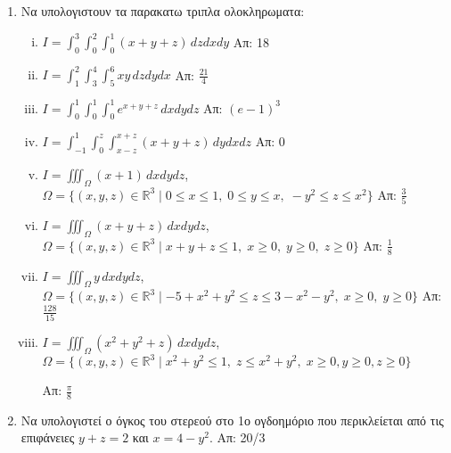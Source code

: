 


\pagestyle{askhseis}
\everymath{\displaystyle}



\begin{center}
  \minibox{\large\bf \textcolor{Col1}{Ασκήσεις Τριπλο Ολοκλήρωμα}}
\end{center}

\vspace{\baselineskip}

\begin{enumerate}
  \item Να υπολογιστουν τα παρακατω τριπλα ολοκληρωματα:
    \begin{enumerate}[i)]
      \item $ I=\int_{0}^{3}\!\!\int_{0}^{2}\!\!\int_{0}^{1}(x+y+z)\,dzdxdy $ 
        \hfill Απ: 18  
      \item $  I=\int_{1}^{2}\!\!\int_{3}^{4}\!\!\int_{5}^{6}xy\,dzdydx  $ 
        \hfill Απ: $ \frac{21}{4} $ 
      \item $ I=\int_{0}^{1}\!\!\int_{0}^{1}\!\!\int_{0}^{1}e^{x+y+z}\,dxdydz $ 
        \hfill Απ: $ (e-1)^{3} $
      \item $ I=\int_{-1}^{1}\!\!\int_{0}^{z}\!\int_{x-z}^{x+z}(x+y+z)\,dydxdz $ 
        \hfill Απ: 0  
      \item $ I=\iiint_{\Omega}(x+1)\,dxdydz $, \quad $ \Omega = \{(x,y,z)\in 
          \mathbb{R}^{3} \mid 0 \leq x \leq 1,\; 0 \leq y \leq x,\; -y^{2} \leq z 
        \leq x^{2} \}$ 
        \hfill Απ: $ \frac{3}{5} $ 
      \item $ I=\iiint_{\Omega} (x+y+z)\,dxdydz $, \quad $ \Omega= \{(x,y,z)\in 
        \mathbb{R}^{3} \mid x+y+z \leq 1,\; x \geq 0,\; y \geq 0,\; z \geq 0 \}  $ 
        \hfill Απ: $ \frac{1}{8} $ 
      \item $ I=\iiint_{\Omega} y\,dxdydz $, \quad $ \Omega = \{ (x,y,z) \in 
          \mathbb{R}^{3} \mid -5 + x^{2}+y^{2} \leq z \leq 3 - x^{2}-y^{2}, \; x 
        \geq 0, \; y \geq 0\}$ 
        \hfill Απ: $ \frac{128}{15} $  
      \item $ I = \iiint_{\Omega} (x^{2}+y^{2}+z) \,dxdydz $, \quad $\Omega = \{ 
        (x,y,z) \in \mathbb{R}^{3} \mid x^{2}+y^{2} \leq 1,\; z \leq x^{2}+y^{2}, 
      \; x \geq 0, y \geq 0, z \geq 0\} $ 

      \hfill Απ: $ \frac{\pi}{8} $ 
    \end{enumerate}

  \item Να υπολογιστεί ο όγκος του στερεού στο 1ο ογδοημόριο που περικλείεται από τις 
    επιφάνειες $y+z=2$ και $x=4-y^{2}$. \hfill Απ: 20/3 


\end{enumerate}
